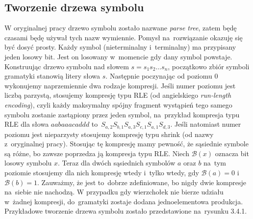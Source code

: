 \documentclass[declaration,shortabstract]{iithesis}
\theoremstyle{definition} \newtheorem{definition}{Definicja}[chapter]
\theoremstyle{remark} \newtheorem{remark}[definition]{Obserwacja}
\theoremstyle{plain} \newtheorem{theorem}[definition]{Twierdzenie}
\theoremstyle{remark} \newtheorem{example}{Przykład}[definition]
\theoremstyle{plain} \newtheorem{lemma}[definition]{Lemat}
\begin{document}
\subsection{Tworzenie drzewa symbolu}

W oryginalnej pracy drzewo symbolu zostało nazwane \textit{parse tree}, zatem będę czasami będę używał tych nazw wymiennie. Pomysł na~rozwiązanie okazuję się być dosyć prosty. Każdy symbol (nieterminalny i~terminalny) ma przypisany jeden losowy bit. Jest on losowany w~momencie gdy dany symbol powstaje. Konstruując drzewo symbolu nad słowem $s = s_1 s_2 \ldots s_n$, początkowo zbiór symboli gramatyki stanowią litery słowa $s$. Następnie poczynając od poziomu $0$ wykonujemy naprzemiennie dwa rodzaje kompresji. Jeśli numer poziomu jest liczbą parzystą, stosujemy kompresję typu RLE (od angielskiego \textit{run-length encoding}), czyli każdy maksymalny spójny fragment wystąpień tego samego symbolu zostanie zastąpiony przez jeden symbol, na~przykład kompresja typu RLE dla słowa $aabaaacaddd$ to~$S_{a, 2} S_{b, 1} S_{a, 3} S_{c, 1} S_{a, 1} S_{d, 3}$. Jeśli natomiast numer poziomu jest nieparzysty stosujemy kompresję typu shrink (od nazwy z~oryginalnej pracy). Stosując tę kompresję mamy pewność, że sąsiednie symbole są różne, bo zawsze poprzedza ją kompresja typu RLE. Niech $\mathcal{B}(x)$ oznacza bit losowy symbolu $x$. Teraz dla dwóch sąsiednich symbolów $a$ oraz $b$ na~tym poziomie stosujemy dla nich kompresję wtedy i~tylko wtedy, gdy $\mathcal{B}(a) = 0$ i~$\mathcal{B}(b) = 1$. Zauważmy, że jest to~dobrze zdefiniowane, bo nigdy dwie kompresje na~siebie nie nachodzą. W przypadku gdy wierzchołek nie bierze udziału w~żadnej kompresji, do~gramatyki zostaje dodana jednoelementowa produkcja. Przykładowe tworzenie drzewa symbolu zostało przedstawione na~rysunku 3.4.1.
\end{document}
